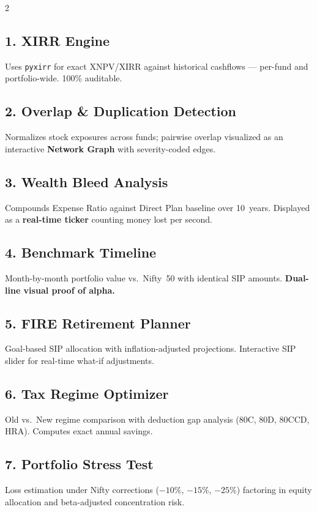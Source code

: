 \documentclass[9pt,a4paper]{article}
\begin{document}
\begin{multicols}{2}
\small

\subsection{1. XIRR Engine}
Uses \texttt{pyxirr} for exact XNPV/XIRR against historical cashflows --- per-fund and portfolio-wide. 100\% auditable.

\subsection{2. Overlap \& Duplication Detection}
Normalizes stock exposures across funds; pairwise overlap visualized as an interactive \textbf{Network Graph} with severity-coded edges.

\subsection{3. Wealth Bleed Analysis}
Compounds Expense Ratio against Direct Plan baseline over 10~years. Displayed as a \textbf{real-time ticker} counting money lost per second.

\subsection{4. Benchmark Timeline}
Month-by-month portfolio value vs.\ Nifty~50 with identical SIP amounts. \textbf{Dual-line visual proof of alpha.}

\subsection{5. FIRE Retirement Planner}
Goal-based SIP allocation with inflation-adjusted projections. Interactive SIP slider for real-time what-if adjustments.

\subsection{6. Tax Regime Optimizer}
Old vs.\ New regime comparison with deduction gap analysis (80C, 80D, 80CCD, HRA). Computes exact annual savings.

\subsection{7. Portfolio Stress Test}
Loss estimation under Nifty corrections ($-10\%$, $-15\%$, $-25\%$) factoring in equity allocation and beta-adjusted concentration risk.

\end{multicols}
\end{document}
